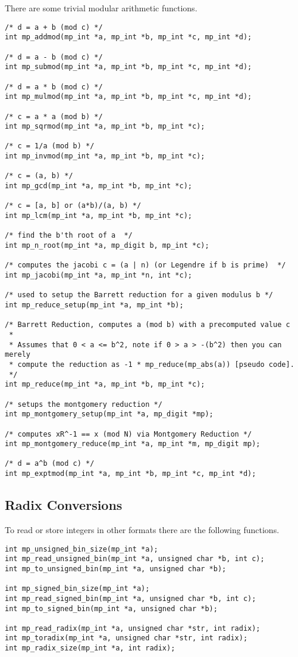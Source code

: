 \documentclass{article}
\begin{document}
There are some trivial modular arithmetic functions.

\begin{verbatim}
/* d = a + b (mod c) */
int mp_addmod(mp_int *a, mp_int *b, mp_int *c, mp_int *d);

/* d = a - b (mod c) */
int mp_submod(mp_int *a, mp_int *b, mp_int *c, mp_int *d);

/* d = a * b (mod c) */
int mp_mulmod(mp_int *a, mp_int *b, mp_int *c, mp_int *d);

/* c = a * a (mod b) */
int mp_sqrmod(mp_int *a, mp_int *b, mp_int *c);

/* c = 1/a (mod b) */
int mp_invmod(mp_int *a, mp_int *b, mp_int *c);

/* c = (a, b) */
int mp_gcd(mp_int *a, mp_int *b, mp_int *c);

/* c = [a, b] or (a*b)/(a, b) */
int mp_lcm(mp_int *a, mp_int *b, mp_int *c);

/* find the b'th root of a  */
int mp_n_root(mp_int *a, mp_digit b, mp_int *c);

/* computes the jacobi c = (a | n) (or Legendre if b is prime)  */
int mp_jacobi(mp_int *a, mp_int *n, int *c);

/* used to setup the Barrett reduction for a given modulus b */
int mp_reduce_setup(mp_int *a, mp_int *b);

/* Barrett Reduction, computes a (mod b) with a precomputed value c  
 *
 * Assumes that 0 < a <= b^2, note if 0 > a > -(b^2) then you can merely
 * compute the reduction as -1 * mp_reduce(mp_abs(a)) [pseudo code].
 */
int mp_reduce(mp_int *a, mp_int *b, mp_int *c);

/* setups the montgomery reduction */
int mp_montgomery_setup(mp_int *a, mp_digit *mp);

/* computes xR^-1 == x (mod N) via Montgomery Reduction */
int mp_montgomery_reduce(mp_int *a, mp_int *m, mp_digit mp);

/* d = a^b (mod c) */
int mp_exptmod(mp_int *a, mp_int *b, mp_int *c, mp_int *d);
\end{verbatim}

\subsection{Radix Conversions}
To read or store integers in other formats there are the following functions.

\begin{verbatim}
int mp_unsigned_bin_size(mp_int *a);
int mp_read_unsigned_bin(mp_int *a, unsigned char *b, int c);
int mp_to_unsigned_bin(mp_int *a, unsigned char *b);

int mp_signed_bin_size(mp_int *a);
int mp_read_signed_bin(mp_int *a, unsigned char *b, int c);
int mp_to_signed_bin(mp_int *a, unsigned char *b);

int mp_read_radix(mp_int *a, unsigned char *str, int radix);
int mp_toradix(mp_int *a, unsigned char *str, int radix);
int mp_radix_size(mp_int *a, int radix);
\end{verbatim}
\end{document}
